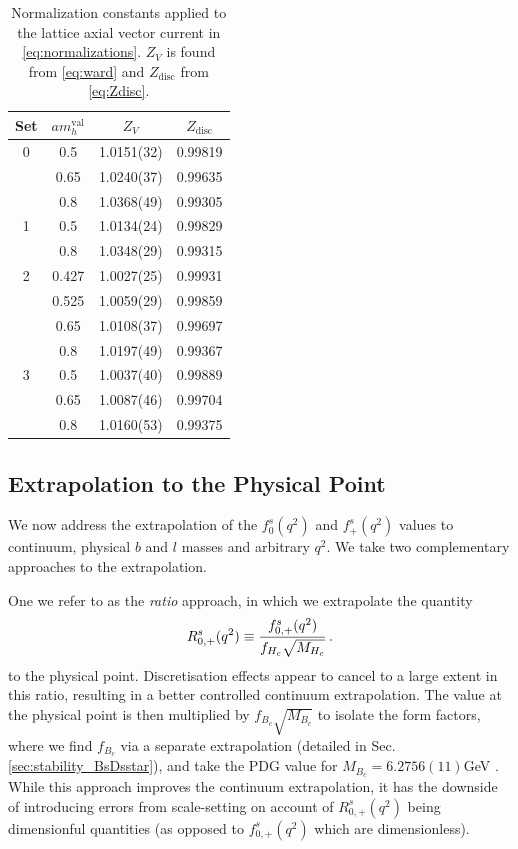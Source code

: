 \begin{table}
\begin{center}
\begin{tabular}{ c c c c }
\hline
Set & $am_h^{\text{val}}$ & $Z_V$& $Z_{\text{disc}}$\\ [0.5ex]
\hline
0 & 0.5 & 1.0151(32) & 0.99819\\ [0.5ex] 
 & 0.65 & 1.0240(37) & 0.99635\\ [0.5ex] 
 & 0.8 & 1.0368(49) & 0.99305\\ [0.5ex] 
\hline
1 & 0.5 & 1.0134(24) & 0.99829\\ [0.5ex] 
 & 0.8 & 1.0348(29) & 0.99315\\ [0.5ex] 
\hline
2 & 0.427 & 1.0027(25) & 0.99931\\ [0.5ex] 
 & 0.525 & 1.0059(29) & 0.99859\\ [0.5ex] 
 & 0.65 & 1.0108(37) & 0.99697\\ [0.5ex] 
 & 0.8 & 1.0197(49) & 0.99367\\ [0.5ex] 
\hline
3 & 0.5 & 1.0037(40) & 0.99889\\ [0.5ex] 
 & 0.65 & 1.0087(46) & 0.99704\\ [0.5ex] 
 & 0.8 & 1.0160(53) & 0.99375\\ [0.5ex] 
\hline
\end{tabular}
    \caption{Normalization constants applied to the lattice axial vector current in \eqref{eq:normalizations}. $Z_V$ is found from \eqref{eq:ward} and $Z_{\text{disc}}$ from \eqref{eq:Zdisc}. \label{tab:norms}}
\end{center}
\end{table}

\subsection{Extrapolation to the Physical Point}
\label{sec:extrapolation}

We now address the extrapolation of the $f_{0}^s(q^2)$ and $f_{+}^s(q^2)$ values to continuum, physical $b$ and $l$ masses and arbitrary $q^2$. We take two complementary approaches to the extrapolation.

One we refer to as the {\textit{ratio}} approach, in which we extrapolate the quantity
\begin{align}
  R^s_{0,+}(q^2) \equiv {f^s_{0,+}(q^2)\over f_{H_c}\sqrt{M_{H_c}}}\,.
  \label{eq:ratio}
\end{align}
to the physical point. Discretisation effects appear to cancel to a large extent in this ratio, resulting in a better controlled continuum extrapolation. The value at the physical point is then multiplied by $f_{B_c}\sqrt{M_{B_c}}$ to isolate the form factors, where we find $f_{B_c}$ via a separate extrapolation (detailed in Sec. \ref{sec:stability_BsDsstar}), and take the PDG value for $M_{B_c} = 6.2756(11)$GeV \cite{PhysRevD.98.030001}. While this approach improves the continuum extrapolation, it has the downside of introducing errors from scale-setting on account of $R_{0,+}^s(q^2)$ being dimensionful quantities (as opposed to $f^s_{0,+}(q^2)$ which are dimensionless).


